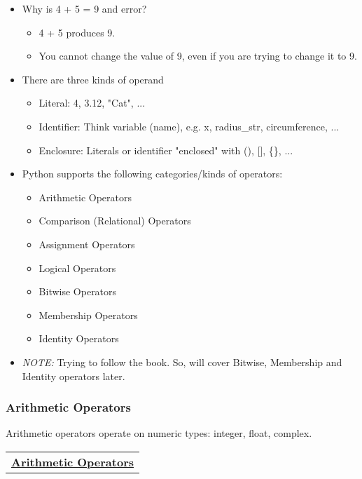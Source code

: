 \documentclass[11pt]{article}
\providecommand{\tightlist}{%
      \setlength{\itemsep}{0pt}\setlength{\parskip}{0pt}}
\begin{document}
    \begin{itemize}
\tightlist
\item
  Why is 4 + 5 = 9 and error?

  \begin{itemize}
  \tightlist
  \item
    4 + 5 produces 9.
  \item
    You cannot change the value of 9, even if you are trying to change
    it to 9.
  \end{itemize}
\item
  There are three kinds of operand

  \begin{itemize}
  \tightlist
  \item
    Literal: 4, 3.12, "Cat", ...
  \item
    Identifier: Think variable (name), e.g. x, radius\_str,
    circumference, ...
  \item
    Enclosure: Literals or identifier "enclosed" with (), {[}{]}, \{\},
    ...
  \end{itemize}
\item
  Python supports the following categories/kinds of operators:

  \begin{itemize}
  \tightlist
  \item
    Arithmetic Operators
  \item
    Comparison (Relational) Operators
  \item
    Assignment Operators
  \item
    Logical Operators
  \item
    Bitwise Operators
  \item
    Membership Operators
  \item
    Identity Operators
  \end{itemize}
\item
  \emph{NOTE:} Trying to follow the book. So, will cover Bitwise,
  Membership and Identity operators later.
\end{itemize}

    \subsubsection{Arithmetic Operators}\label{arithmetic-operators}

Arithmetic operators operate on numeric types: integer, float, complex.

\begin{longtable}[]{@{}c@{}}
\toprule
\tabularnewline
\midrule
\endhead
\href{https://www.tutorialspoint.com/python/python_basic_operators.htm}{\textbf{Arithmetic
Operators}}\tabularnewline
\bottomrule
\end{longtable}
\end{document}
